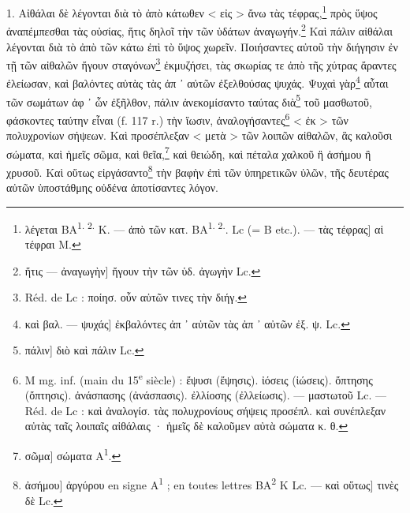 \documentclass[a4paper, 11pt, oneside, polutonikogreek, french]{article}
\begin{document}
\bigskip

1. Αἰθάλαι δὲ λέγονται διὰ τὸ ἀπὸ κάτωθεν < εἰς > ἄνω τὰς τέφρας,\footnote{λέγεται BA\textsuperscript{1. 2.} K. --- ἀπὸ τῶν κατ. BA\textsuperscript{1. 2.}. Lc (= B etc.). --- τὰς τέφρας] αἱ τέφραι M.} πρὸς ὕψος ἀναπέμπεσθαι τὰς οὐσίας, ἥτις δηλοῖ τὴν τῶν ὑδάτων ἀναγωγήν.\footnote{ἥτις --- ἀναγωγὴν] ἤγουν τὴν τῶν ὑδ. ἀγωγὴν Lc.} Καὶ πάλιν αἰθάλαι λέγονται διὰ τὸ ἀπὸ τῶν κάτω ἐπὶ τὸ ὕψος χωρεῖν. Ποιήσαντες αὐτοῦ τὴν διήγησιν ἐν τῇ τῶν αἰθαλῶν ἤγουν σταγόνων\footnote{Réd. de Lc : ποίησ. οὖν αὐτῶν τινες τὴν διήγ.} ἐκμυζήσει, τὰς σκωρίας τε ἀπὸ τῆς χύτρας ἄραντες ἐλείωσαν, καὶ βαλόντες αὐτὰς τὰς ἀπ ᾽ αὐτῶν ἐξελθούσας ψυχάς. Ψυχαὶ γὰρ\footnote{καὶ βαλ. --- ψυχάς] ἐκβαλόντες ἀπ ᾽ αὐτῶν τὰς ἀπ ᾽ αὐτῶν ἐξ. ψ. Lc.} αὗται τῶν σωμάτων ἀφ ᾽ ὧν ἐξῆλθον, πάλιν ἀνεκομίσαντο ταύτας διὰ\footnote{πάλιν] διὸ καὶ πάλιν Lc.} τοῦ μασθωτοῦ, φάσκοντες ταύτην εἶναι (f. 117 r.) τὴν ἴωσιν, ἀναλογήσαντες\footnote{M mg. inf. (main du 15\textsuperscript{e} siècle) : ἔψυσι (ἔψησις). ἰόσεις (ἰώσεις). ὄπτησης (ὄπτησις). ἀνάσπασης (ἀνάσπασις). ἐλλίοσης (ἐλλείωσις). --- μαστωτοῦ Lc. --- Réd. de Lc : καὶ ἀναλογίσ. τὰς πολυχρονίους σήψεις προσέπλ. καὶ συνέπλεξαν αὐτὰς ταῖς λοιπαῖς αἰθάλαις · ἡμεῖς δὲ καλοῦμεν αὐτὰ σώματα κ. θ.} < ἐκ > τῶν πολυχρονίων σήψεων. Καὶ προσέπλεξαν < μετὰ > τῶν λοιπῶν αἰθαλῶν, ἃς καλοῦσι σώματα, καὶ ἡμεῖς σῶμα, καὶ θεῖα,\footnote{σῶμα] σώματα A\textsuperscript{1}.} καὶ θειώδη, καὶ πέταλα χαλκοῦ ἢ ἀσήμου ἢ χρυσοῦ. Καὶ οὕτως εἰργάσαντο\footnote{ἀσήμου] ἀργύρου en signe A\textsuperscript{1} ; en toutes lettres BA\textsuperscript{2} K Lc. --- καὶ οὕτως] τινὲς δὲ Lc.} τὴν βαφὴν ἐπὶ τῶν ὑπηρετικῶν ὑλῶν, τῆς δευτέρας αὐτῶν ὑποστάθμης οὐδένα ἀποτίσαντες λόγον.
\end{document}
